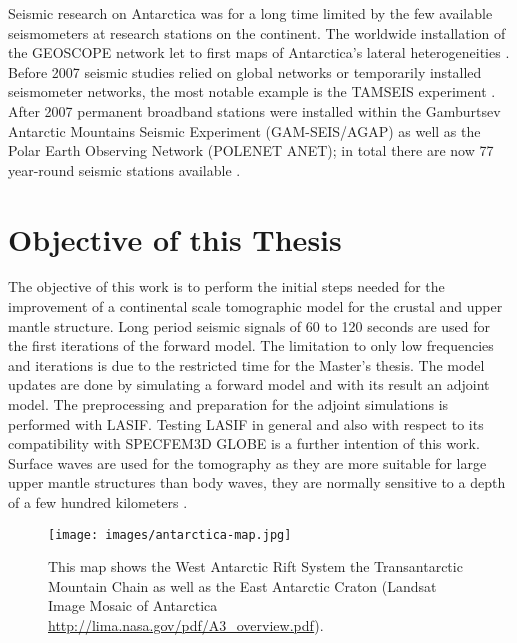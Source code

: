 Seismic research on Antarctica was for a long time limited by the few available seismometers at research stations on the continent. 
The worldwide installation of the GEOSCOPE network let to first maps of Antarctica's lateral heterogeneities \citep{Roult1994}.
Before 2007 seismic studies relied on global networks or temporarily installed seismometer networks, the most notable
example is the TAMSEIS experiment \citep{Lawrence2006}. 
After 2007 permanent broadband stations were installed within the Gamburtsev Antarctic Mountains Seismic Experiment (GAM-SEIS/AGAP)
as well as the Polar Earth Observing Network (POLENET ANET); 
in total there are now 77 year-round seismic stations available \citep{Anthony2014}.  


\section{Objective of this Thesis} %

The objective of this work is to perform the initial steps needed for the improvement of a continental scale tomographic model for the crustal and upper mantle structure.
Long period seismic signals of 60 to 120 seconds %
are used for the first iterations of the forward model. 
The limitation to only low frequencies and %
iterations is due to the restricted time for the Master's thesis.
The model updates are done by simulating a forward model and with its result an adjoint model. %
The preprocessing and preparation for the adjoint simulations is performed with LASIF. 
Testing LASIF in general and also with respect to its compatibility with SPECFEM3D GLOBE is a further intention of this work.
Surface waves are used for the tomography as they are more suitable for large upper mantle structures than body waves, 
they are normally sensitive to a depth of a few hundred kilometers \citep{Morelli2004}.

 


\begin{figure}[H]
\begin{center}
\texttt{[image: images/antarctica-map.jpg]}
\caption{This map shows the West Antarctic Rift System the Transantarctic Mountain Chain as well as the East Antarctic Craton 
(Landsat Image Mosaic of Antarctica \url{http://lima.nasa.gov/pdf/A3_overview.pdf}).}
\label{ant-map}
\end{center}
\end{figure}